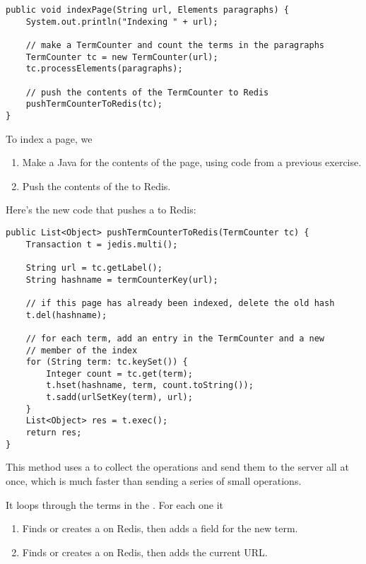 \documentclass[12pt]{book}
\theoremstyle{exercise}
\begin{document}
\begin{verbatim}
public void indexPage(String url, Elements paragraphs) {
    System.out.println("Indexing " + url);

    // make a TermCounter and count the terms in the paragraphs
    TermCounter tc = new TermCounter(url);
    tc.processElements(paragraphs);

    // push the contents of the TermCounter to Redis
    pushTermCounterToRedis(tc);
}
\end{verbatim}

To index a page, we

\begin{enumerate}

\item
  Make a Java  for the contents of the page, using
  code from a previous exercise.

\item
  Push the contents of the  to Redis.

\end{enumerate}

Here's the new code that pushes a  to Redis:

\begin{verbatim}
public List<Object> pushTermCounterToRedis(TermCounter tc) {
    Transaction t = jedis.multi();

    String url = tc.getLabel();
    String hashname = termCounterKey(url);

    // if this page has already been indexed, delete the old hash
    t.del(hashname);

    // for each term, add an entry in the TermCounter and a new
    // member of the index
    for (String term: tc.keySet()) {
        Integer count = tc.get(term);
        t.hset(hashname, term, count.toString());
        t.sadd(urlSetKey(term), url);
    }
    List<Object> res = t.exec();
    return res;
}
\end{verbatim}

This method uses a  to collect the operations and
send them to the server all at once, which is much faster than sending a
series of small operations.


It loops through the terms in the . For each one it

\begin{enumerate}

\item
  Finds or creates a  on Redis, then adds a field
  for the new term.

\item
  Finds or creates a  on Redis, then adds the current
  URL.

\end{enumerate}
\end{document}
